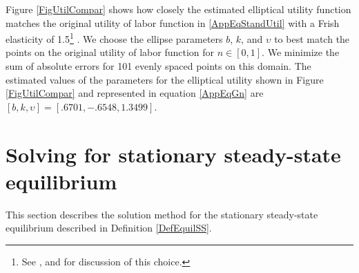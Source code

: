 \documentclass[letterpaper,12pt]{article}
\theoremstyle{definition}
\renewcommand\theenumi{\roman{enumi}}
\begin{document}
  Figure \ref{FigUtilCompar} shows how closely the estimated elliptical utility function matches the original utility of labor function in \eqref{AppEqStandUtil} with a Frish elasticity of 1.5\footnote{See \citet{Chetty:2011}, \citet{KeaneRogerson:2012} and \citet{Peterman:2014} for discussion of this choice.} . We choose the ellipse parameters $b$, $k$, and $\upsilon$ to best match the points on the original utility of labor function for $n\in[0,1]$. We minimize the sum of absolute errors for 101 evenly spaced points on this domain. The estimated values of the parameters for the elliptical utility shown in Figure \ref{FigUtilCompar} and represented in equation \eqref{AppEqGn} are $[b,k,\upsilon] = [.6701,-.6548,1.3499]$.

  \clearpage


\newpage
\section{Solving for stationary steady-state equilibrium}\label{AppSSsolve}

  \setcounter{equation}{0}
  \renewcommand\theenumi{\arabic{enumi}}
  \renewcommand\theenumii{\alph{enumii}}
  \renewcommand\theenumiii{\roman{enumiii}}

  This section describes the solution method for the stationary steady-state equilibrium described in Definition \ref{DefEquilSS}.
\end{document}
